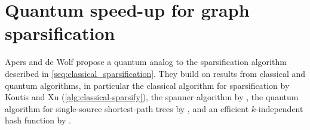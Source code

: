 \section{Quantum speed-up for graph sparsification}

Apers and de Wolf propose a quantum analog to the sparsification algorithm described in
\autoref{seq:classical_sparsification}. They build on results from classical
and quantum algorithms, in particular the classical algorithm for sparsification by Koutis and Xu (\autoref{alg:classical-sparsify}), the spanner algorithm by \citeauthor{Thorup_Zwick_2005} \cite{Thorup_Zwick_2005}, the quantum algorithm for single-source shortest-path trees by
\citeauthor{Durr_Heiligman_2006} \cite{Durr_Heiligman_2006}, and an efficient $k$-independent hash function
by \citeauthor{christiani_independence_2015} \cite{christiani_independence_2015}.









